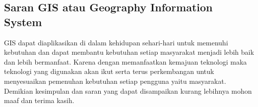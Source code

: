 \subsection{Saran GIS atau Geography Information System}
GIS dapat diaplikasikan di dalam kehidupan sehari-hari untuk memenuhi kebutuhan dan dapat membantu kebutuhan setiap masyarakat menjadi lebih baik dan lebih bermanfaat. Karena dengan memanfaatkan kemajuan teknologi maka teknologi yang digunakan akan ikut serta terus perkembangan untuk menyesuaikan pemenuhan kebutuhan setiap pengguna yaitu masyarakat. Demikian kesimpulan dan saran yang dapat disampaikan kurang lebihnya mohon maaf dan terima kasih.

